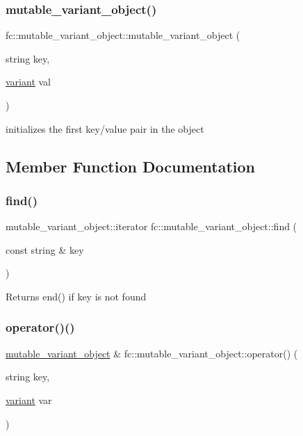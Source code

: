 \subsubsection{\texorpdfstring{mutable\+\_\+variant\+\_\+object()}{mutable\_variant\_object()}}
{\footnotesize\ttfamily fc\+::mutable\+\_\+variant\+\_\+object\+::mutable\+\_\+variant\+\_\+object (\begin{DoxyParamCaption}\item[{string}]{key,  }\item[{\mbox{\hyperlink{classfc_1_1variant}{variant}}}]{val }\end{DoxyParamCaption})}

initializes the first key/value pair in the object 

\subsection{Member Function Documentation}
\mbox{\label{classfc_1_1mutable__variant__object_ae3b38166303f37671545d2a35ba23dc6}} 
\subsubsection{\texorpdfstring{find()}{find()}}
{\footnotesize\ttfamily mutable\+\_\+variant\+\_\+object\+::iterator fc\+::mutable\+\_\+variant\+\_\+object\+::find (\begin{DoxyParamCaption}\item[{const string \&}]{key }\end{DoxyParamCaption})}

\begin{DoxyReturn}{Returns}
end() if key is not found 
\end{DoxyReturn}
\mbox{\label{classfc_1_1mutable__variant__object_a2264868c8516f3a7558cd4f530673cd6}} 
\subsubsection{\texorpdfstring{operator()()}{operator()()}\hspace{0.1cm}{\footnotesize\ttfamily [1/3]}}
{\footnotesize\ttfamily \mbox{\hyperlink{classfc_1_1mutable__variant__object}{mutable\+\_\+variant\+\_\+object}} \& fc\+::mutable\+\_\+variant\+\_\+object\+::operator() (\begin{DoxyParamCaption}\item[{string}]{key,  }\item[{\mbox{\hyperlink{classfc_1_1variant}{variant}}}]{var }\end{DoxyParamCaption})}

